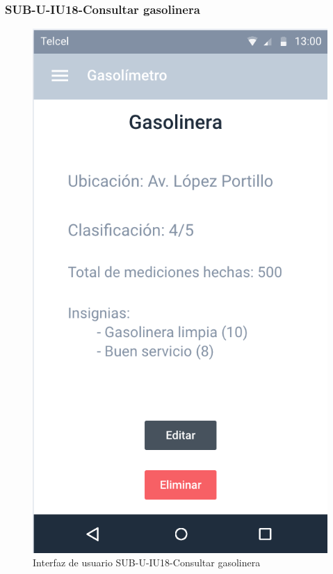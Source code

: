 \subsubsection{SUB-U-IU18-Consultar gasolinera}\label{SUB-U-IU18}
\begin{figure}[H]
	\centering
	\includegraphics[scale=1]{Capitulo4/software/submodulos/usuarios/images/sub-u-iu18}
	\caption{Interfaz de usuario SUB-U-IU18-Consultar gasolinera}
	\label{fig:sub-u-iu18}
\end{figure}